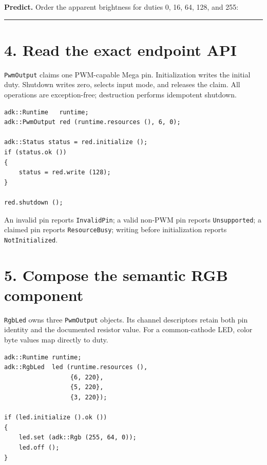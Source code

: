 \documentclass[11pt]{article}
\newcommand{\blankline}{\rule{0.96\linewidth}{0.35pt}}
\begin{document}
\begin{center}
\end{center}

\textbf{Predict.} Order the apparent brightness for duties
0, 16, 64, 128, and 255:
\par\blankline

\section*{4. Read the exact endpoint API}

\texttt{PwmOutput} claims one PWM-capable Mega pin. Initialization writes the
initial duty. Shutdown writes zero, selects input mode, and releases the claim.
All operations are exception-free; destruction performs idempotent shutdown.

\begin{lstlisting}[style=adkcpp]
adk::Runtime   runtime;
adk::PwmOutput red (runtime.resources (), 6, 0);

adk::Status status = red.initialize ();
if (status.ok ())
{
    status = red.write (128);
}

red.shutdown ();
\end{lstlisting}

An invalid pin reports \texttt{InvalidPin}; a valid non-PWM pin reports
\texttt{Unsupported}; a claimed pin reports \texttt{ResourceBusy}; writing
before initialization reports \texttt{NotInitialized}.

\section*{5. Compose the semantic RGB component}

\texttt{RgbLed} owns three \texttt{PwmOutput} objects. Its channel descriptors
retain both pin identity and the documented resistor value. For a
common-cathode LED, color byte values map directly to duty.

\begin{lstlisting}[style=adkcpp]
adk::Runtime runtime;
adk::RgbLed  led (runtime.resources (),
                  {6, 220},
                  {5, 220},
                  {3, 220});

if (led.initialize ().ok ())
{
    led.set (adk::Rgb (255, 64, 0));
    led.off ();
}
\end{lstlisting}
\end{document}
